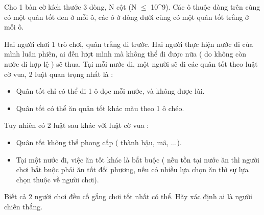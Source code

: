 Cho 1 bàn cờ kích thước 3 dòng, N cột (N $\le$ 10^9). Các ô thuộc dòng trên cùng có một quân tốt đen ở mỗi ô, các ô ở dòng dưới cùng có một quân tốt trắng ở mỗi ô.


Hai người chơi 1 trò chơi, quân trắng đi trước. Hai người thực hiện nước đi của mình luân phiên, ai đến lượt mình mà không thể đi được nữa ( do không còn nước đi hợp lệ ) sẽ thua. Tại mỗi nước đi, một người sẽ đi các quân tốt theo luật cờ vua, 2 luật quan trọng nhất là :
\begin{itemize}
	\item Quân tốt chỉ có thể đi 1 ô dọc mỗi nước, và không được lùi.
	\item Quân tốt có thể ăn quân tốt khác màu theo 1 ô chéo.
\end{itemize}

Tuy nhiên có 2 luật sau khác với luật cờ vua :
\begin{itemize}
	\item Quân tốt không thể phong cấp ( thành hậu, mã, ...).
	\item Tại một nước đi, việc ăn tốt khác là bắt buộc ( nếu tồn tại nước ăn thì người chơi bắt buộc phải ăn tốt đối phương, nếu có nhiều lựa chọn ăn thì sự lựa chọn thuộc về người chơi).
\end{itemize}

Biết cả 2 người chơi đều cố gắng chơi tốt nhất có thể. Hãy xác định ai là người chiến thắng.